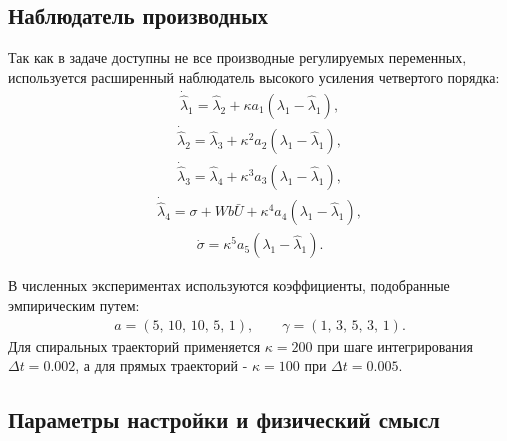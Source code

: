 \subsection{Наблюдатель производных}

Так как в задаче доступны не все производные регулируемых переменных, используется расширенный наблюдатель высокого усиления четвертого порядка:
\begin{gather}
    \dot{\hat{\lambda}}_1 = \hat{\lambda}_2 + \kappa a_1 (\lambda_1 - \hat{\lambda}_1),
\end{gather}
\begin{gather}
    \dot{\hat{\lambda}}_2 = \hat{\lambda}_3 + \kappa^2 a_2 (\lambda_1 - \hat{\lambda}_1),
\end{gather}
\begin{gather}
    \dot{\hat{\lambda}}_3 = \hat{\lambda}_4 + \kappa^3 a_3 (\lambda_1 - \hat{\lambda}_1),
\end{gather}
\begin{gather}
    \dot{\hat{\lambda}}_4 = \sigma + W b \bar{U} + \kappa^4 a_4 (\lambda_1 - \hat{\lambda}_1),
\end{gather}
\begin{gather}
    \dot{\sigma} = \kappa^5 a_5 (\lambda_1 - \hat{\lambda}_1).
\end{gather}

В численных экспериментах используются коэффициенты, подобранные эмпирическим путем:
\begin{gather}
    a = (5,\,10,\,10,\,5,\,1), \qquad
    \gamma = (1,\,3,\,5,\,3,\,1).
\end{gather}
Для спиральных траекторий применяется $\kappa = 200$ при шаге интегрирования $\Delta t = 0.002$, а для прямых траекторий - $\kappa = 100$ при $\Delta t = 0.005$.

\subsection{Параметры настройки и физический смысл}


